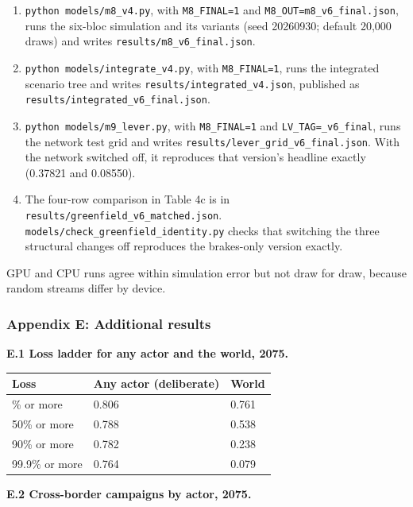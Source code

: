 \documentclass[
  10pt,
]{article}
\newcounter{none} %
\providecommand{\tightlist}{%
  \setlength{\itemsep}{0pt}\setlength{\parskip}{0pt}}
\begin{document}
\begin{enumerate}
\def\labelenumi{\arabic{enumi}.}
\tightlist
\item
  \texttt{python\ models/m8\_v4.py}, with \texttt{M8\_FINAL=1} and
  \texttt{M8\_OUT=m8\_v6\_final.json}, runs the six-bloc simulation and its variants (seed 20260930;
  default 20,000 draws) and writes \texttt{results/m8\_v6\_final.json}.
\item
  \texttt{python\ models/integrate\_v4.py}, with \texttt{M8\_FINAL=1}, runs the integrated scenario
  tree and writes \texttt{results/integrated\_v4.json}, published as
  \texttt{results/integrated\_v6\_final.json}.
\item
  \texttt{python\ models/m9\_lever.py}, with \texttt{M8\_FINAL=1} and \texttt{LV\_TAG=\_v6\_final},
  runs the network test grid and writes \texttt{results/lever\_grid\_v6\_final.json}. With the
  network switched off, it reproduces that version's headline exactly (0.37821 and 0.08550).
\item
  The four-row comparison in Table 4c is in \texttt{results/greenfield\_v6\_matched.json}.
  \texttt{models/check\_greenfield\_identity.py} checks that switching the three structural changes
  off reproduces the brakes-only version exactly.
\end{enumerate}

GPU and CPU runs agree within simulation error but not draw for draw, because random streams differ
by device.

\subsubsection{Appendix E: Additional results}\label{appendix-e-additional-results}

\textbf{E.1 Loss ladder for any actor and the world, 2075.}

{\def\LTcaptype{none} %
\begin{longtable}[]{@{}lll@{}}
\toprule\noalign{}
Loss & Any actor (deliberate) & World \\
\midrule\noalign{}
\endhead
\bottomrule\noalign{}
\endlastfoot
10\% or more & 0.806 & 0.761 \\
50\% or more & 0.788 & 0.538 \\
90\% or more & 0.782 & 0.238 \\
99.9\% or more & 0.764 & 0.079 \\
\end{longtable}
}

\textbf{E.2 Cross-border campaigns by actor, 2075.}
\end{document}
